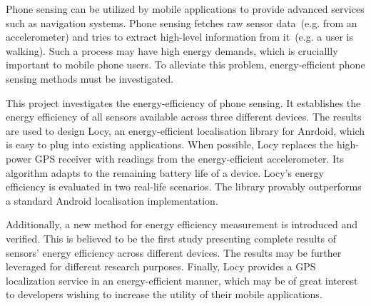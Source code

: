 Phone sensing can be utilized by mobile applications to provide advanced services such as navigation systems. Phone sensing fetches raw sensor data\ (e.g. from an accelerometer) and tries to extract high-level information from it\ (e.g. a user is walking). Such a process may have high energy demands, which is cruciallly important to mobile phone users. To alleviate this problem, energy-efficient  phone sensing methods must be investigated.  

This project investigates the energy-efficiency of phone sensing. It establishes the energy efficiency of all sensors available across three different devices. The results are used to design Locy, an energy-efficient localisation library for Anrdoid, which is easy to plug into existing applications. When possible, Locy replaces the high-power GPS receiver with readings from the energy-efficient accelerometer. Its algorithm adapts to the remaining battery life of a device. Locy's energy efficiency is evaluated in two real-life scenarios. The library provably outperforms a standard Android localisation implementation.

Additionally, a new method for energy efficiency measurement is introduced and verified. This is believed to be the first study presenting complete results of sensors' energy efficiency across different devices. The results may be further leveraged for different research purposes. Finally, Locy provides a GPS localization service in an energy-efficient manner, which may be of great interest to developers wishing to increase the utility of their mobile applications.

